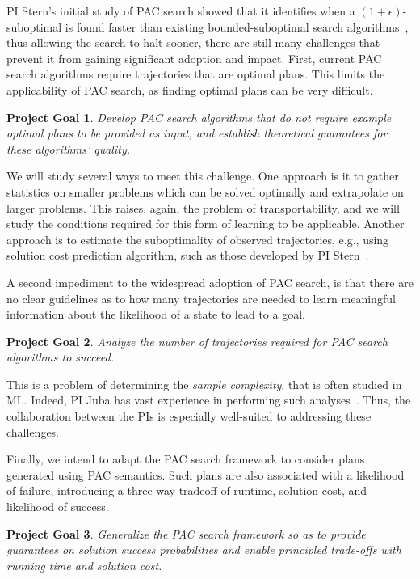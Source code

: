 \documentclass[12pt]{article}
\newtheorem{problem}{Project Goal}
\begin{document}
PI Stern's initial study of PAC search showed 
that it identifies when a $(1+\epsilon)$-suboptimal is found faster than existing bounded-suboptimal search algorithms~\cite{stern2011probably,stern2012search}, thus allowing the search to halt sooner, there are still many challenges that prevent it from gaining significant adoption and impact. First, current PAC search algorithms require trajectories that are optimal plans. This limits the applicability of PAC search, as finding optimal plans can be very difficult. 
\begin{problem}
Develop PAC search algorithms that do not require example optimal plans to be provided as input, and establish theoretical guarantees for these algorithms' quality.
\end{problem}
We will study several ways to meet this challenge. One approach is it to gather statistics on smaller problems which can be solved optimally and extrapolate on larger problems. This raises, again, the problem of transportability, and we will study the conditions required for this form of learning to be applicable. 
Another approach is to estimate the suboptimality of observed trajectories, e.g., using solution cost prediction algorithm, such as those developed by PI Stern~\cite{lelis2016predicting,lelis2011predicting}. 



A second impediment to the widespread adoption of PAC search, is that there are no clear guidelines as to how many trajectories are needed to learn meaningful information about the likelihood of a state to lead to a goal. 
\begin{problem}
Analyze the number of trajectories required for PAC search algorithms to succeed.
\end{problem}
This is a problem of determining the {\em sample complexity}, that is often studied in ML. Indeed, PI Juba has vast experience in performing such analyses~\cite{goldreich2012theory,juba2013ijcai,juba2016jmlr,juba2016aaai,zhang2017aaai}. Thus, the collaboration between the PIs is especially well-suited to addressing these challenges. 


Finally, we intend to adapt the PAC search framework to consider plans generated using PAC semantics. Such plans are also associated with a likelihood of failure, introducing a three-way tradeoff of runtime, solution cost, and likelihood of success. 
\begin{problem}
Generalize the PAC search framework so as to provide guarantees on solution success probabilities and enable principled trade-offs with running time and solution cost. 
\end{problem}
\end{document}
